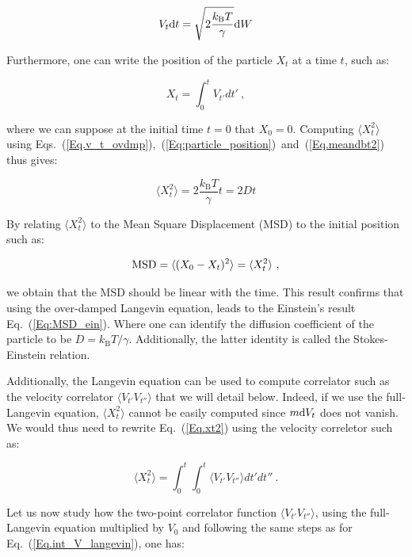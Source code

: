\begin{equation}
	V_t\textnormal{d}t  = \sqrt{2\frac{k_\mathrm{B}T}{\gamma}} \textnormal{d}W 
	\label{Eq.v_t_ovdmp}
\end{equation}

Furthermore, one can write the position of the particle $X_t$ at a time $t$, such as:

\begin{equation}
	X_t = \int _0 ^t V_{t'}dt'~,
	\label{Eq:particle_position}
\end{equation}

where we can suppose at the initial time $t=0$ that $X_0 = 0$. Computing 
$\langle X_t^2 \rangle$ using Eqs.~(\ref{Eq.v_t_ovdmp}),~(\ref{Eq:particle_position})~and~(\ref{Eq.meandbt2}) thus gives:

\begin{equation}
	\langle X_t ^2 \rangle =  2\frac{k_\mathrm{B}T}{\gamma}t = 2Dt
	\label{Eq.xt2}
\end{equation}

By relating $\langle X_t ^2 \rangle$ to the Mean Square Displacement (\gls{MSD}) to the initial position such as:

\begin{equation}
	\textnormal{MSD} = \langle (X_0 - X_ t)^2 \rangle =  \langle X_t ^2 \rangle~,
\end{equation}


we obtain that the \gls{MSD} should be linear with the time. This result confirms that using the over-damped Langevin equation, leads to the Einstein's result Eq.~(\ref{Eq:MSD_ein}). Where one can identify the diffusion coefficient of the particle to be $D = k_\mathrm{B}T / \gamma$. Additionally, the latter identity is called the Stokes-Einstein  relation.


Additionally, the Langevin equation can be used to compute correlator such as the velocity correlator $ \langle V_{t'}V_{t''} \rangle$ that we will detail below. Indeed, if we use the full-Langevin equation, $\langle X_t ^2 \rangle$ cannot be easily computed since $m\textnormal{d} V_t$ does not vanish. We would thus need to rewrite Eq.~(\ref{Eq.xt2})  using the velocity correletor such as:

\begin{equation}
	\langle X_t ^ 2 \rangle  = \int _0 ^ {t} \int _0 ^{t} \langle V_{t'}V_{t''} \rangle dt'dt'' ~.
	\label{Eq.int_msd}
\end{equation}

Let us now study how the two-point correlator function $ \langle V_{t'}V_{t''} \rangle $, using the full-Langevin equation multiplied by $V_0$ and following the same steps as for Eq.~(\ref{Eq.int_V_langevin}), one  has:

